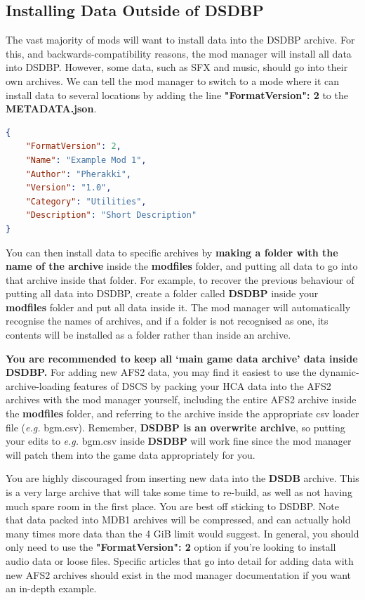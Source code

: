 \documentclass{article}
\begin{document}
\newpage
\subsection{Installing Data Outside of DSDBP}\label{Section:InstallingNonMainData}
The vast majority of mods will want to install data into the DSDBP archive. For this, and backwards-compatibility reasons, the mod manager will install all data into DSDBP. However, some data, such as SFX and music, should go into their own archives. We can tell the mod manager to switch to a mode where it can install data to several locations by adding the line \textbf{"FormatVersion": 2} to the \textbf{METADATA.json}.
\begin{lstlisting}[language=json,firstnumber=1]
{
    "FormatVersion": 2,
    "Name": "Example Mod 1",
    "Author": "Pherakki",
    "Version": "1.0",
    "Category": "Utilities",
    "Description": "Short Description"
}
\end{lstlisting}
You can then install data to specific archives by \textbf{making a folder with the name of the archive} inside the \textbf{modfiles} folder, and putting all data to go into that archive inside that folder. For example, to recover the previous behaviour of putting all data into DSDBP, create a folder called \textbf{DSDBP} inside your \textbf{modfiles} folder and put all data inside it. The mod manager will automatically recognise the names of archives, and if a folder is not recognised as one, its contents will be installed as a folder rather than inside an archive.

\textbf{You are recommended to keep all `main game data archive' data inside DSDBP.} For adding new AFS2 data, you may find it easiest to use the dynamic-archive-loading features of DSCS by packing your HCA data into the AFS2 archives with the mod manager yourself, including the entire AFS2 archive inside the \textbf{modfiles} folder, and referring to the archive inside the appropriate csv loader file (\textit{e.g.} bgm.csv). Remember, \textbf{DSDBP is an overwrite archive}, so putting your edits to \textit{e.g.} bgm.csv inside \textbf{DSDBP} will work fine since the mod manager will patch them into the game data appropriately for you. 

You are highly discouraged from inserting new data into the \textbf{DSDB} archive. This is a very large archive that will take some time to re-build, as well as not having much spare room in the first place. You are best off sticking to DSDBP. Note that data packed into MDB1 archives will be compressed, and can actually hold many times more data than the 4 GiB limit would suggest. In general, you should only need to use the \textbf{"FormatVersion": 2} option if you're looking to install audio data or loose files. Specific articles that go into detail for adding data with new AFS2 archives should exist in the mod manager documentation if you want an in-depth example.
\end{document}
